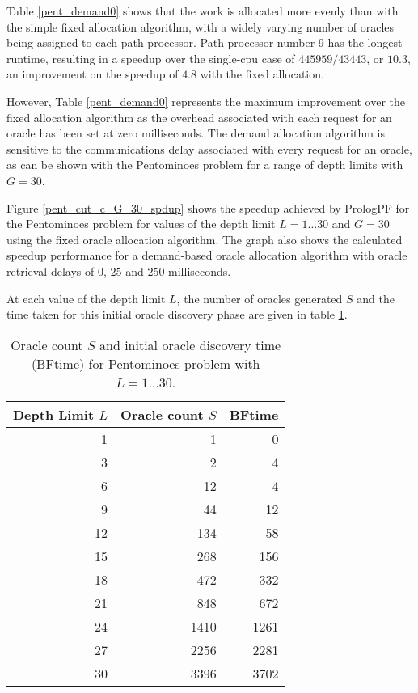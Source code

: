 Table \ref{pent_demand0} shows that the work is allocated more evenly than with the simple
fixed allocation algorithm,  with a widely varying number of oracles being assigned to
each path processor.  Path processor number 9 has the longest runtime, resulting in a
speedup over the single-cpu case of $445959/43443$, or $10.3$, an improvement on the speedup of
$4.8$ with the fixed allocation.

However, Table \ref{pent_demand0} represents the maximum improvement over the fixed allocation
algorithm as the overhead associated with each request for an oracle has been set at zero
milliseconds.  The demand allocation algorithm is sensitive to the communications delay
associated with every request for an oracle, as can be shown with the Pentominoes problem for
a range of depth limits with $G=30$.

Figure \ref{pent_cut_c_G_30_spdup} shows the speedup achieved by PrologPF for the Pentominoes
problem for values of the depth limit $L=1\ldots 30$ and $G=30$ using the fixed oracle allocation
algorithm.  The graph also shows the calculated speedup performance for a demand-based
oracle allocation algorithm with oracle retrieval delays of $0$, $25$ and $250$
milliseconds.

At each value of the depth limit $L$, the number of oracles generated $S$ and the time
taken for this initial oracle discovery phase are given in table \ref{pent_L_S_BFtime}.

\begin{table}[htb]
{\small
\begin{tabular}{| r | r | r |}
\hline
\textbf{Depth Limit $L$} & \textbf{Oracle count $S$} & \textbf{BFtime} \\
\hline
1  &    1 & 0 \\
3  &    2 & 4 \\
6  &   12 & 4 \\
9  &   44 & 12 \\
12 &  134 & 58 \\
15 &  268 & 156 \\
18 &  472 & 332 \\
21 &  848 & 672 \\
24 & 1410 & 1261 \\
27 & 2256 & 2281 \\
30 & 3396 & 3702 \\
\hline
\end{tabular}
}
\caption{Oracle count $S$ and initial oracle discovery time (BFtime) for Pentominoes
  problem with $L=1\ldots 30$.}
\label{pent_L_S_BFtime}
\end{table}


